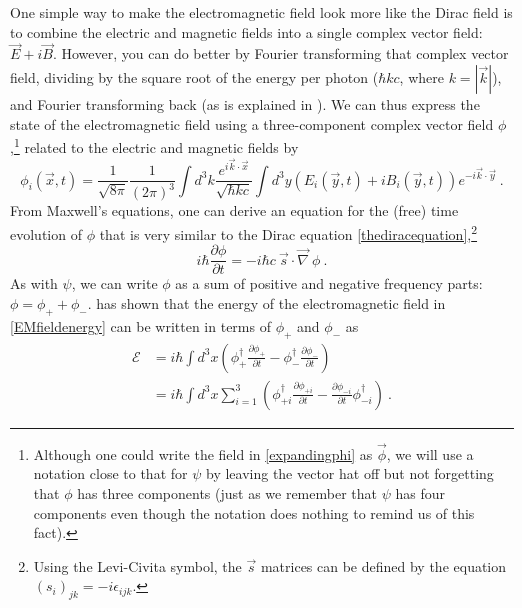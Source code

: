 \documentclass[onecolumn,secnumarabic,amsmath,amssymb,balancelastpage,nofootinbib]{article}
\begin{document}
One simple way to make the electromagnetic field look more like the Dirac field is to combine the electric and magnetic fields into a single complex vector field: $\vec{E}+i\vec{B}$.  However, you can do better by Fourier transforming that complex vector field, dividing by the square root of the energy per photon ($\hbar k c$, where $k=|\vec{k}|$), and Fourier transforming back (as is explained in \citealp{good1957, emasqp}).  We can thus express the state of the electromagnetic field using a three-component complex vector field $\phi$,\footnote{Although one could write the field in \eqref{expandingphi} as $\vec{\phi}$, we will use a notation close to that for $\psi$ by leaving the vector hat off but not forgetting that $\phi$ has three components (just as we remember that $\psi$ has four components even though the notation does nothing to remind us of this fact).} related to the electric and magnetic fields by
\begin{equation}
\phi_i(\vec{x},t)=\frac{1}{\sqrt{8\pi}}\frac{1}{(2\pi)^3}\int{ d^3 k  \frac{e^{i \vec{k}\cdot\vec{x}}}{\sqrt{\hbar k c}} \int{d^3 y\left(E_i(\vec{y},t)+iB_i(\vec{y},t)\right)e^{-i \vec{k}\cdot\vec{y}}} }
\label{expandingphi}
\ .
\end{equation}
From Maxwell's equations, one can derive an equation for the (free) time evolution of $\phi$ that is very similar to the Dirac equation \eqref{thediracequation},\footnote{Using the Levi-Civita symbol, the $\vec{s}$ matrices can be defined by the equation $(s_i)_{jk}=-i \epsilon_{ijk}$.}
\begin{equation}
i\hbar\frac{\partial \phi}{\partial t}  = -i \hbar c \: \vec{s}\cdot \vec{\nabla}\: \phi
\ .
\end{equation}
As with $\psi$, we can write $\phi$ as a sum of positive and negative frequency parts: $\phi=\phi_++\phi_-$.  \citet[eq.\ 31]{good1957} has shown that the energy of the electromagnetic field in \eqref{EMfieldenergy} can be written in terms of $\phi_+$ and $\phi_-$ as
\begin{align}
\mathcal{E}&=i \hbar \int{d^3 x \left(\phi^{\dagger}_+ \frac{\partial\phi_+}{\partial t} - \phi^{\dagger}_- \frac{\partial \phi_-}{\partial t} \right)}
\nonumber
\\
&=i \hbar \int{d^3 x \sum_{i=1}^3\left(\phi^{\dagger}_{+i} \frac{\partial\phi_{+i}}{\partial t} -  \frac{\partial \phi_{-i}}{\partial t} \phi^{\dagger}_{-i}\right)}
\ .
\label{phienergy}
\end{align}
\end{document}
